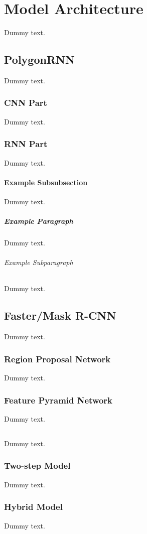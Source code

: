 \chapter{Model Architecture}

Dummy text.

\section{PolygonRNN}\label{modpol}

Dummy text.

\subsection{CNN Part}

Dummy text.

\subsection{RNN Part}

Dummy text.

\subsubsection{Example Subsubsection}

Dummy text.

\paragraph{Example Paragraph}

Dummy text.

\subparagraph{Example Subparagraph}

Dummy text.

\section{Faster/Mask R-CNN}

Dummy text.

\subsection{Region Proposal Network}

Dummy text.

\subsection{Feature Pyramid Network}\label{modfpn}

Dummy text.

\section{\modelnameshort}\label{modmer}

Dummy text.

\subsection{Two-step Model}

Dummy text.

\subsection{Hybrid Model}

Dummy text.
